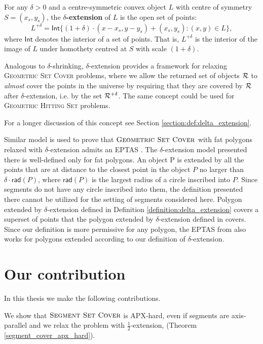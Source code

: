 \newcommand{\Int}{\mathsf{Int}}
\begin{defi}
\label{definition:delta_extension}
For any $\delta > 0$ and a centre-symmetric convex object $L$ with
centre of symmetry $S = (x_s, y_s)$,
the \textbf{$\delta$-extension} of $L$ is the open set of points:
$$L^{+\delta} = \Int\{(1 + \delta)\cdot(x - x_s, y - y_s) + (x_s, y_s) : (x, y) \in L\},$$
where $\Int$ denotes the interior of a set of points.
That is, $L^{+\delta}$ is the interior of the image of $L$ under homothety centred
at $S$ with scale $(1+\delta)$.
\end{defi}

Analogous to $\delta$-shrinking,
$\delta$-extension provides a framework for relaxing
\textsc{Geometric} \textsc{Set} \textsc{Cover} problems, where we allow the returned set of
objects $\mathcal{R}$ to \textit{almost} cover the points in the universe
by requiring that they are covered by $\mathcal{R}$ after $\delta$-extension,
i.e. by the set $\mathcal{R}^{+\delta}$.
The same concept could be used for \textsc{Geometric Hitting Set} problems.
 
For a longer discussion of this concept see Section
\ref{section:def:delta_extension}.

Similar model is used to prove that $\textsc{Geometric Set Cover}$ with fat polygons
relaxed with $\delta$-extension admits an EPTAS \cite{harpeled12}.
The $\delta$-extension model presented there is well-defined only
for fat polygons. An object P is extended by all the points that
are at distance to the closest point in the object $P$
no larger than $\delta\cdot \mathsf{rad}(P)$, where $\mathsf{rad}(P)$
is the largest radius of a circle inscribed into $P$.
Since segments do not have any circle inscribed into them,
the definition presented there cannot be utilized
for the setting of segments considered here.
Polygon extended by $\delta$-extension
defined in Definition \ref{definition:delta_extension}
covers a superset of points that the polygon extended
by $\delta$-extension defined in \cite{harpeled12} covers.
Since our definition is more permissive for any polygon,
the EPTAS from \cite{harpeled12}
also works for polygons extended
according to our definition of $\delta$-extension.

\section{Our contribution}
In this thesis we make the following contributions.

We show that $\textsc{Segment Set Cover}$ is APX-hard,
even if segments are axis-parallel and we relax the problem with $\frac{1}{2}$-extension,
(Theorem \ref{segment_cover_apx_hard}).

